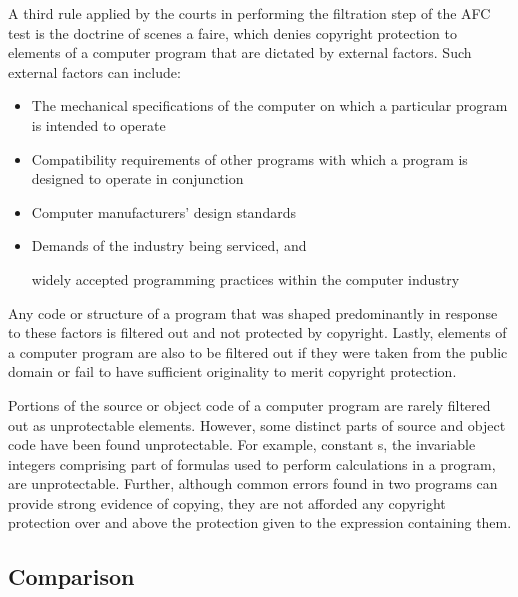 A third rule applied by the courts in performing the filtration step of
the AFC test is the doctrine of scenes a faire, which denies copyright
protection to elements of a computer program that are dictated by external
factors. Such external factors can include:

\begin{itemize}

  \item The mechanical
specifications of the computer on which a particular program is intended
to operate

  \item Compatibility requirements of other programs with which a
program is designed to operate in conjunction

  \item Computer manufacturers'
design standards

  \item Demands of the industry being serviced, and

widely accepted programming practices within the computer industry

\end{itemize}

Any code or structure of a program that was shaped predominantly in
response to these factors is filtered out and not protected by
copyright. Lastly, elements of a computer program are also to be filtered
out if they were taken from the public domain or fail to have sufficient
originality to merit copyright protection.

Portions of the source or object code of a computer program are rarely
filtered out as unprotectable elements. However, some distinct parts of
source and object code have been found unprotectable. For example,
constant s, the invariable integers comprising part of formulas used to
perform calculations in a program, are unprotectable. Further, although
common errors found in two programs can provide strong evidence of
copying, they are not afforded any copyright protection over and above the
protection given to the expression containing them.

\subsection{Comparison}


